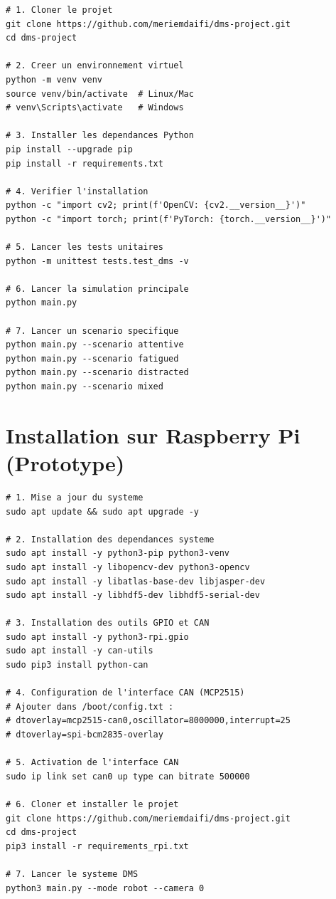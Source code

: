 \begin{lstlisting}[style=pythonstyle, caption={Procédure d'installation complète.}, language={}]
# 1. Cloner le projet
git clone https://github.com/meriemdaifi/dms-project.git
cd dms-project

# 2. Creer un environnement virtuel
python -m venv venv
source venv/bin/activate  # Linux/Mac
# venv\Scripts\activate   # Windows

# 3. Installer les dependances Python
pip install --upgrade pip
pip install -r requirements.txt

# 4. Verifier l'installation
python -c "import cv2; print(f'OpenCV: {cv2.__version__}')"
python -c "import torch; print(f'PyTorch: {torch.__version__}')"

# 5. Lancer les tests unitaires
python -m unittest tests.test_dms -v

# 6. Lancer la simulation principale
python main.py

# 7. Lancer un scenario specifique
python main.py --scenario attentive
python main.py --scenario fatigued
python main.py --scenario distracted
python main.py --scenario mixed
\end{lstlisting}

\section{Installation sur Raspberry Pi (Prototype)}

\begin{lstlisting}[style=pythonstyle, caption={Installation sur Raspberry Pi.}, language={}]
# 1. Mise a jour du systeme
sudo apt update && sudo apt upgrade -y

# 2. Installation des dependances systeme
sudo apt install -y python3-pip python3-venv
sudo apt install -y libopencv-dev python3-opencv
sudo apt install -y libatlas-base-dev libjasper-dev
sudo apt install -y libhdf5-dev libhdf5-serial-dev

# 3. Installation des outils GPIO et CAN
sudo apt install -y python3-rpi.gpio
sudo apt install -y can-utils
sudo pip3 install python-can

# 4. Configuration de l'interface CAN (MCP2515)
# Ajouter dans /boot/config.txt :
# dtoverlay=mcp2515-can0,oscillator=8000000,interrupt=25
# dtoverlay=spi-bcm2835-overlay

# 5. Activation de l'interface CAN
sudo ip link set can0 up type can bitrate 500000

# 6. Cloner et installer le projet
git clone https://github.com/meriemdaifi/dms-project.git
cd dms-project
pip3 install -r requirements_rpi.txt

# 7. Lancer le systeme DMS
python3 main.py --mode robot --camera 0
\end{lstlisting}

